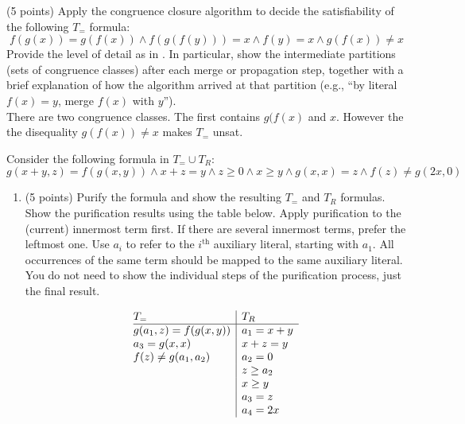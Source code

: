 \documentclass{handout}
\begin{document}
\begin{questions}
\item (5 points) \label{prob:smt:first} Apply the congruence closure algorithm
to decide the satisfiability of the following $T_=$ formula:
\[
f(g(x)) = g(f(x)) \wedge f(g(f(y))) = x \wedge f(y) = x \wedge g(f(x)) \neq x
\]
Provide the level of detail as in .  In particular, show the
intermediate partitions (sets of congruence classes) after each merge or
propagation step, together with a brief explanation of how the algorithm arrived
at that partition (e.g., ``by literal $f(x) = y$, merge $f(x)$ with $y$'').
\label{prob:first}
\\

There are two congruence classes. The first contains $g(f(x)$ and $x$. However the the disequality $g(f(x)) \neq x$ makes $T_{=}$ unsat.







\item Consider the following formula in $T_=\cup T_R$:
\[
g(x + y, z) = f(g(x, y)) \wedge x + z = y \wedge z \geq 0 \wedge x \geq y \wedge g(x, x) = z \wedge f(z) \neq g(2x, 0)
\]

\begin{enumerate}
\item (5 points) Purify the formula and show the resulting $T_=$ and $T_R$
formulas. Show the purification results using the table below. Apply
purification to the (current) innermost term first.  If there are several
innermost terms, prefer the leftmost one.  Use $a_i$ to refer to the
$i^\text{th}$ auxiliary literal, starting with $a_1$.  All occurrences of the
same term should be mapped to the same auxiliary literal. You do not need to
show the individual steps of the purification process, just the final result.

\[
\begin{array}{@{}l|l}
T_=           & T_R\\ \hline
 g(a_1,z) = f(g(x,y))& a_1 = x + y \\
 a_3 = g(x,x) & x + z = y \\
 f(z) \neq g(a_1,a_2)& a_2 = 0 \\
 & z \geq a_2 \\
 & x \geq y\\
 & a_3 = z\\
 & a_4 = 2x\\


\end{array}\]
\end{enumerate}
\end{questions}
\end{document}
